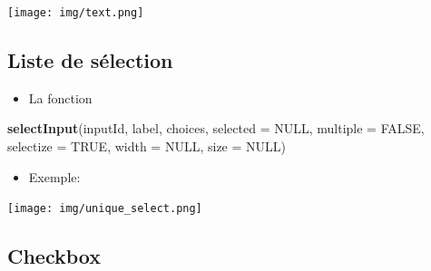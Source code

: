 \documentclass[
]{article}
\newenvironment{Shaded}{\begin{snugshade}}{\end{snugshade}}
\newcommand{\AttributeTok}[1]{\textcolor[rgb]{0.13,0.29,0.53}{#1}}
\newcommand{\CommentTok}[1]{\textcolor[rgb]{0.56,0.35,0.01}{\textit{#1}}}
\newcommand{\ConstantTok}[1]{\textcolor[rgb]{0.56,0.35,0.01}{#1}}
\newcommand{\DecValTok}[1]{\textcolor[rgb]{0.00,0.00,0.81}{#1}}
\newcommand{\FunctionTok}[1]{\textcolor[rgb]{0.13,0.29,0.53}{\textbf{#1}}}
\newcommand{\NormalTok}[1]{#1}
\newcommand{\OtherTok}[1]{\textcolor[rgb]{0.56,0.35,0.01}{#1}}
\newcommand{\StringTok}[1]{\textcolor[rgb]{0.31,0.60,0.02}{#1}}
\providecommand{\tightlist}{%
  \setlength{\itemsep}{0pt}\setlength{\parskip}{0pt}}
\begin{document}
\texttt{[image: img/text.png]}

\hypertarget{liste-de-suxe9lection}{%
\subsection{Liste de sélection}\label{liste-de-suxe9lection}}

\begin{itemize}
\tightlist
\item
  La fonction
\end{itemize}

\begin{Shaded}
\begin{Highlighting}[]
\FunctionTok{selectInput}\NormalTok{(inputId, label, choices, }\AttributeTok{selected =} \ConstantTok{NULL}\NormalTok{, }\AttributeTok{multiple =} \ConstantTok{FALSE}\NormalTok{,}
            \AttributeTok{selectize =} \ConstantTok{TRUE}\NormalTok{, }\AttributeTok{width =} \ConstantTok{NULL}\NormalTok{, }\AttributeTok{size =} \ConstantTok{NULL}\NormalTok{)}
\end{Highlighting}
\end{Shaded}

\begin{itemize}
\tightlist
\item
  Exemple:
\end{itemize}

\begin{Shaded}
\end{Shaded}

\texttt{[image: img/unique\_select.png]}

\hypertarget{checkbox}{%
\subsection{Checkbox}\label{checkbox}}
\end{document}
